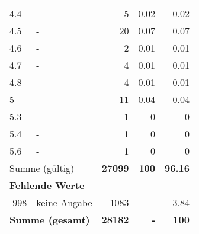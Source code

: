 \begin{longtable}{lXrrr}
        4.4 & \multicolumn{1}{X}{-} & %
          \num{5} &
          \num[round-mode=places,round-precision=2]{0.02} &
          \num[round-mode=places,round-precision=2]{0.02} \\

        4.5 & \multicolumn{1}{X}{-} & %
          \num{20} &
          \num[round-mode=places,round-precision=2]{0.07} &
          \num[round-mode=places,round-precision=2]{0.07} \\

        4.6 & \multicolumn{1}{X}{-} & %
          \num{2} &
          \num[round-mode=places,round-precision=2]{0.01} &
          \num[round-mode=places,round-precision=2]{0.01} \\

        4.7 & \multicolumn{1}{X}{-} & %
          \num{4} &
          \num[round-mode=places,round-precision=2]{0.01} &
          \num[round-mode=places,round-precision=2]{0.01} \\

        4.8 & \multicolumn{1}{X}{-} & %
          \num{4} &
          \num[round-mode=places,round-precision=2]{0.01} &
          \num[round-mode=places,round-precision=2]{0.01} \\

        5 & \multicolumn{1}{X}{-} & %
          \num{11} &
          \num[round-mode=places,round-precision=2]{0.04} &
          \num[round-mode=places,round-precision=2]{0.04} \\

        5.3 & \multicolumn{1}{X}{-} & %
          \num{1} &
          \num[round-mode=places,round-precision=2]{0} &
          \num[round-mode=places,round-precision=2]{0} \\

        5.4 & \multicolumn{1}{X}{-} & %
          \num{1} &
          \num[round-mode=places,round-precision=2]{0} &
          \num[round-mode=places,round-precision=2]{0} \\

        5.6 & \multicolumn{1}{X}{-} & %
          \num{1} &
          \num[round-mode=places,round-precision=2]{0} &
          \num[round-mode=places,round-precision=2]{0} \\

     \midrule
     \multicolumn{2}{l}{Summe (gültig)} &
       \textbf{\num{27099}} &
     \textbf{\num{100}} &
       \textbf{\num[round-mode=places,round-precision=2]{96.16}} \\
     \multicolumn{5}{l}{\textbf{Fehlende Werte}}\\
       -998 &
       keine Angabe &
         \num{1083} &
        - &
         \num[round-mode=places,round-precision=2]{3.84} \\
     \midrule
     \multicolumn{2}{l}{\textbf{Summe (gesamt)}} &
          \textbf{\num{28182}} &
        \textbf{-} &
        \textbf{\num{100}} \\
     \bottomrule
     \end{longtable}
     
